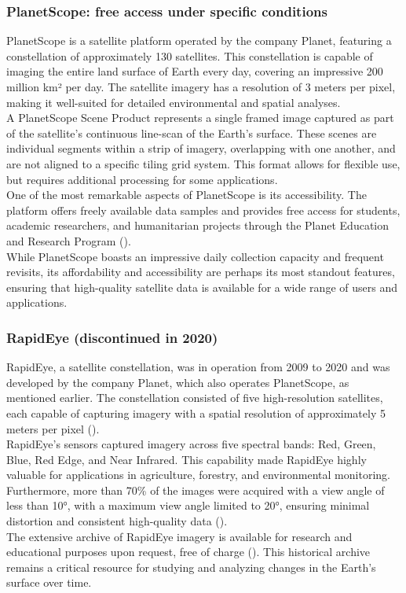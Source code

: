 \documentclass[a4paper,12pt]{article}
\begin{document}
\subsubsection{PlanetScope: free access under specific conditions}
PlanetScope is a satellite platform operated by the company Planet, featuring a constellation of approximately 130 satellites. This constellation is capable of imaging the entire land surface of Earth every day, covering an impressive 200 million km² per day. The satellite imagery has a resolution of 3 meters per pixel, making it well-suited for detailed environmental and spatial analyses.\\
A PlanetScope Scene Product represents a single framed image captured as part of the satellite’s continuous line-scan of the Earth's surface. These scenes are individual segments within a strip of imagery, overlapping with one another, and are not aligned to a specific tiling grid system. This format allows for flexible use, but requires additional processing for some applications.\\
One of the most remarkable aspects of PlanetScope is its accessibility. The platform offers freely available data samples and provides free access for students, academic researchers, and humanitarian projects through the Planet Education and Research Program (\cite{planet_planetscope_2024}).\\
While PlanetScope boasts an impressive daily collection capacity and frequent revisits, its affordability and accessibility are perhaps its most standout features, ensuring that high-quality satellite data is available for a wide range of users and applications.

\subsubsection{RapidEye (discontinued in 2020)}
RapidEye, a satellite constellation, was in operation from 2009 to 2020 and was developed by the company Planet, which also operates PlanetScope, as mentioned earlier. The constellation consisted of five high-resolution satellites, each capable of capturing imagery with a spatial resolution of approximately 5 meters per pixel (\cite{planet_rapideye_2024}).\\
RapidEye's sensors captured imagery across five spectral bands: Red, Green, Blue, Red Edge, and Near Infrared. This capability made RapidEye highly valuable for applications in agriculture, forestry, and environmental monitoring. Furthermore, more than 70\% of the images were acquired with a view angle of less than 10°, with a maximum view angle limited to 20°, ensuring minimal distortion and consistent high-quality data (\cite{esa_rapideye_nodate}).\\
The extensive archive of RapidEye imagery is available for research and educational purposes upon request, free of charge (\cite{planet_planet_nodate}). This historical archive remains a critical resource for studying and analyzing changes in the Earth's surface over time.
\end{document}
